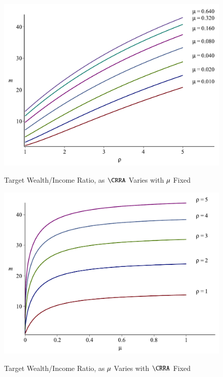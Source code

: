 \documentclass[titlepage,abstract]{\econtex}\newcommand{\texname}{ctDiscrete}
\begin{document}
\begin{figure}%
\caption{Target Wealth/Income Ratio, as $\CRRA$ Varies with $\mu$ Fixed}%
\medskip%
\includegraphics{./Figures/mTargetUrateFixedCRRAVaries_4}%
\label{fig:mTargetUrateFixedCRRAVaries}%
\end{figure}

\begin{figure}%
\caption{Target Wealth/Income Ratio, as $\mu$ Varies with $\CRRA$ Fixed}%
\medskip%
\includegraphics{./Figures/mTargetCRRAFixedUrateVaries_4}%
\label{fig:mTargetCRRAFixedUrateVaries}%
\end{figure}
\end{document}
